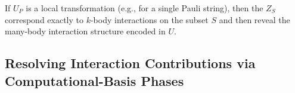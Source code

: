 \documentclass[
  aps,
  pra,
  reprint,            %
  superscriptaddress, %
  amsmath,amssymb,
  notitlepage
]{revtex4-2}
\theoremstyle{plain}
\theoremstyle{definition}
\theoremstyle{definition}
\begin{document}
If $U_P$ is a local transformation (e.g., for a single Pauli string), then the $Z_S$ correspond exactly to $k$-body interactions on the subset $S$ and then reveal the many-body interaction structure encoded in $U$.

\subsection{Resolving Interaction Contributions via Computational-Basis Phases}

\noindent








\end{document}
